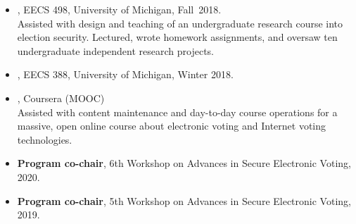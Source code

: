 \documentclass[11pt]{article}
\begin{document}

\vspace{-6pt}

\begin{itemize}[label={--\ },leftmargin=0.25in,labelsep=0.1625em]
\addtolength{\itemsep}{-0.4\baselineskip}


\item{}, EECS 498, University of Michigan, Fall~2018.\\
   {\small Assisted with design and teaching of an undergraduate research course into election security. Lectured, wrote homework assignments, and oversaw ten undergraduate independent research projects.}

\item{}, EECS 388, University of Michigan, Winter 2018. 

\item
{}, Coursera (MOOC)\\
    {\small Assisted with content maintenance and day-to-day course operations for a massive, open online course about electronic voting and Internet voting technologies.}
    
\end{itemize}


\newpage

\vspace{8pt}

\vspace{-6pt}

\begin{itemize}[label={--\ },leftmargin=0.25in,labelsep=0.1625em]
\addtolength{\itemsep}{-0.5\baselineskip}
\item \textbf{Program co-chair}, 
6th Workshop on Advances in Secure Electronic Voting, 2020.
\item \textbf{Program co-chair}, 
5th Workshop on Advances in Secure Electronic Voting, 2019.
\end{itemize}
\end{document}
